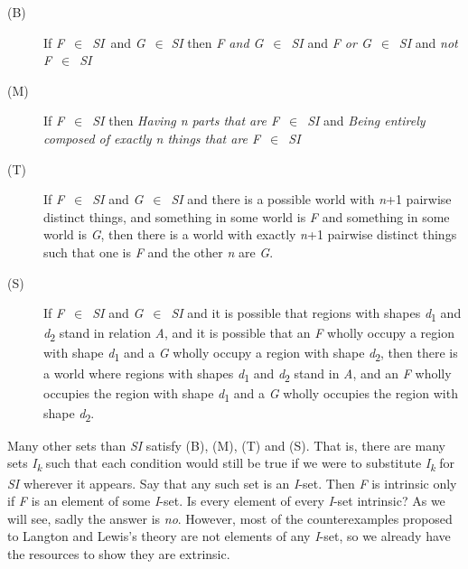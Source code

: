 \begin{description}
\item[(B)] If \textit{F}~${\in}$~\textit{SI}~and \textit{G}~${\in}$\textit{ SI} then \textit{F and G}~${\in}$~\textit{SI} and \textit{F or G}~${\in}$~\textit{SI} and \textit{not F}~${\in}$~\textit{SI}
\item[(M)] If \textit{F}~${\in}$~\textit{SI} then \textit{Having n parts that are F}~${\in}$~\textit{SI} and \textit{Being entirely composed of exactly n things that are F}~${\in}$~\textit{SI}
\item[(T)] If \textit{F}~${\in}$~\textit{SI} and \textit{G}~${\in}$~\textit{SI} and there is a possible world with \textit{n}+1 pairwise distinct things, and something in some world is \textit{F} and something in some world is \textit{G}, then there is a world with exactly \textit{n}+1 pairwise distinct things such that one is \textit{F} and the other \textit{n} are \textit{G}.
\item[(S)] If \textit{F}~${\in}$~\textit{SI} and \textit{G}~${\in}$~\textit{SI} and it is possible that regions with shapes \textit{d}\textsubscript{1} and \textit{d}\textsubscript{2} stand in relation \textit{A}, and it is possible that an \textit{F} wholly occupy a region with shape \textit{d}\textsubscript{1} and a \textit{G} wholly occupy a region with shape \textit{d}\textsubscript{2}, then there is a world where regions with shapes \textit{d}\textsubscript{1} and \textit{d}\textsubscript{2} stand in \textit{A}, and an \textit{F} wholly occupies the region with shape \textit{d}\textsubscript{1} and a \textit{G} wholly occupies the region with shape \textit{d}\textsubscript{2}.
\end{description}

\noindent Many other sets than \textit{SI} satisfy (B), (M), (T) and (S). That is, there are many sets \textit{I}\textit{\textsubscript{k}} such that each condition would still be true if we were to substitute \textit{I}\textit{\textsubscript{k}} for \textit{SI} wherever it appears. Say that any such set is an \textit{I}\nobreakdash-set. Then \textit{F} is intrinsic only if \textit{F} is an element of some \textit{I}\nobreakdash-set. Is every element of every \textit{I}\nobreakdash-set intrinsic? As we will see, sadly the answer is \textit{no}. However, most of the counterexamples proposed to Langton and Lewis's theory are not elements of any \textit{I}\nobreakdash-set, so we already have the resources to show they are extrinsic.


